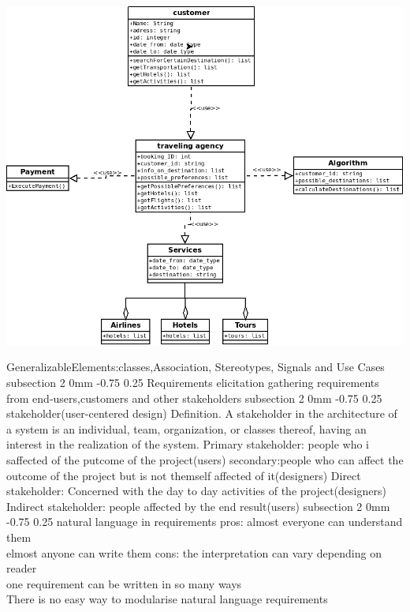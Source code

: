 \documentclass[a4paper,11pt]{article}
\makeatletter
\renewcommand{\subsection}{\@startsection
   {subsection}%
   {2}%
   {0mm}%
   {-0.75\baselineskip}%
   {0.25\baselineskip}%
   {\rmfamily\normalfont\slshape\normalsize}}%
\makeatother
\begin{document}
\centerline{\includegraphics[scale=0.4]{Diagram1}}
GeneralizableElements:classes,Association, Stereotypes, Signals and Use Cases
\subsection{Requirements elicitation}
gathering requirements from end-users,customers and other stakeholders
\subsection{stakeholder(user-centered design)}
Definition. A stakeholder in the architecture of a system is an individual, team, organization, or classes thereof, having an interest in the realization of the system. 
\newline
Primary stakeholder: people who i saffected of the putcome of the project(users)\newline
secondary:people who can affect the outcome of the project but is not themself affected of it(designers)
 \newline
 Direct stakeholder: Concerned with the day to day activities of the project(designers)
 \newline
 Indirect stakeholder: people affected by the end result(users)
 \subsection{natural language in requirements}
 pros:
 \newline
 almost everyone can understand them\\
 elmost anyone can write them
 cons:
 \newline
 the interpretation can vary depending on reader
 \\one requirement can be written in so many ways
 \\There is no easy way to modularise natural language requirements
 
\end{document}
